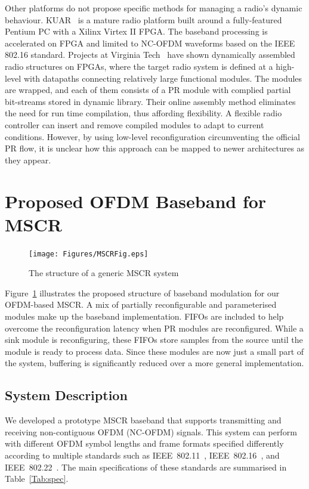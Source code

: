 Other platforms do not propose specific methods for managing a radio's dynamic behaviour.
KUAR~\cite{Minden2007} is a mature radio platform built around a fully-featured Pentium PC with a Xilinx Virtex II FPGA.
The baseband processing is accelerated on FPGA and limited to NC-OFDM waveforms based on the IEEE 802.16 standard.
Projects at Virginia Tech~\cite{athanaswires} have shown dynamically assembled radio structures on FPGAs, where the target radio system is defined at a high-level with datapaths connecting relatively large functional modules.
The modules are wrapped, and each of them consists of a PR module with complied partial bit-streams stored in dynamic library.
Their online assembly method eliminates the need for run time compilation, thus affording flexibility.
A flexible radio controller can insert and remove compiled modules to adapt to current conditions.
However, by using low-level reconfiguration circumventing the official PR flow, it is unclear how this approach can be mapped to newer architectures as they appear.

\section{Proposed OFDM Baseband for MSCR}
\begin{figure}
\texttt{[image: Figures/MSCRFig.eps]}
\caption{The structure of a generic MSCR system}
\label{fig:struc}
\end{figure}

Figure~\ref{fig:struc} illustrates the proposed structure of baseband modulation for our OFDM-based MSCR.
A mix of partially reconfigurable and parameterised modules make up the baseband implementation.
FIFOs are included to help overcome the reconfiguration latency when PR modules are reconfigured.
While a sink module is reconfiguring, these FIFOs store samples from the source until the module is ready to process data.
Since these modules are now just a small part of the system, buffering is significantly reduced over a more general implementation.

\subsection{System Description}

We developed a prototype MSCR baseband that supports transmitting and receiving non-contiguous OFDM (NC-OFDM) signals.
This system can perform with different OFDM symbol lengths and frame formats specified differently according to multiple standards such as IEEE~802.11~\cite{IEEE80211}, IEEE~802.16~\cite{IEEE80216}, and IEEE~802.22~\cite{IEEE80222}.
The main specifications of these standards are summarised in Table~\ref{Tab:spec}.

